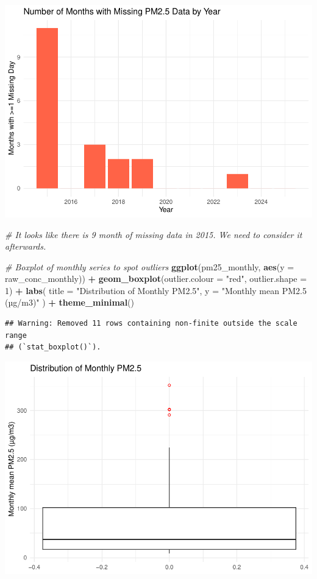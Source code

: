 \documentclass[
]{article}
\newenvironment{Shaded}{\begin{snugshade}}{\end{snugshade}}
\newcommand{\AttributeTok}[1]{\textcolor[rgb]{0.13,0.29,0.53}{#1}}
\newcommand{\CommentTok}[1]{\textcolor[rgb]{0.56,0.35,0.01}{\textit{#1}}}
\newcommand{\DecValTok}[1]{\textcolor[rgb]{0.00,0.00,0.81}{#1}}
\newcommand{\FunctionTok}[1]{\textcolor[rgb]{0.13,0.29,0.53}{\textbf{#1}}}
\newcommand{\NormalTok}[1]{#1}
\newcommand{\SpecialCharTok}[1]{\textcolor[rgb]{0.81,0.36,0.00}{\textbf{#1}}}
\newcommand{\StringTok}[1]{\textcolor[rgb]{0.31,0.60,0.02}{#1}}
\begin{document}
\includegraphics{v_1_files/figure-latex/read-pm25-2.pdf}

\begin{Shaded}
\begin{Highlighting}[]
\CommentTok{\# It looks like there is 9 month of missing data in 2015. We need to consider it afterwards.}

\CommentTok{\# Boxplot of monthly series to spot outliers}
\FunctionTok{ggplot}\NormalTok{(pm25\_monthly, }\FunctionTok{aes}\NormalTok{(}\AttributeTok{y =}\NormalTok{ raw\_conc\_monthly)) }\SpecialCharTok{+}
  \FunctionTok{geom\_boxplot}\NormalTok{(}\AttributeTok{outlier.colour =} \StringTok{"red"}\NormalTok{, }\AttributeTok{outlier.shape =} \DecValTok{1}\NormalTok{) }\SpecialCharTok{+}
  \FunctionTok{labs}\NormalTok{(}
    \AttributeTok{title =} \StringTok{"Distribution of Monthly PM2.5"}\NormalTok{,}
    \AttributeTok{y     =} \StringTok{"Monthly mean PM2.5 (µg/m3)"}
\NormalTok{  ) }\SpecialCharTok{+}
  \FunctionTok{theme\_minimal}\NormalTok{()}
\end{Highlighting}
\end{Shaded}

\begin{verbatim}
## Warning: Removed 11 rows containing non-finite outside the scale range
## (`stat_boxplot()`).
\end{verbatim}

\includegraphics{v_1_files/figure-latex/read-pm25-3.pdf}
\end{document}
